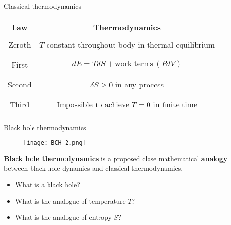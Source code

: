 \documentclass[compress,usenames,dvipsnames,8pt]{beamer}
\theoremstyle{definition}
\renewcommand{\(}{\begin{columns}}
\renewcommand{\)}{\end{columns}}
\newcommand{\<}[1]{\begin{column}{#1}}
\renewcommand{\>}{\end{column}}
\begin{document}
\begin{frame}{Classical thermodynamics}


\begin{center}
\begin{tabular}{|cc|}
\hline
Law & Thermodynamics \\
\hline \hline 
& \\
Zeroth & $T$ constant throughout body in thermal equilibrium\\ 
& \\ 
 \hline 
& \\
 First & $dE=TdS+\text{work terms}\,(PdV)$  \\
& \\
\hline 
& \\
Second & $\delta S\ge 0$ in any process \\
& \\
\hline
& \\
Third & Impossible to achieve $T=0$ in finite time \\
& \\
\hline
\end{tabular}
\end{center}

\addtocounter{framenumber}{-1}


\end{frame}


\begin{frame}{Black hole thermodynamics}

\begin{figure}
				\texttt{[image: BCH-2.png]}
			\end{figure}

\begin{center}
\textbf{Black hole thermodynamics} is a proposed close mathematical \textbf{analogy} between black hole dynamics and classical thermodynamics. 
\end{center}

\pause 

\begin{itemize}
\item What is a black hole?
\item What is the analogue of temperature $T$?
\item What is the analogue of entropy $S$?
\end{itemize}
\end{frame}
\end{document}

